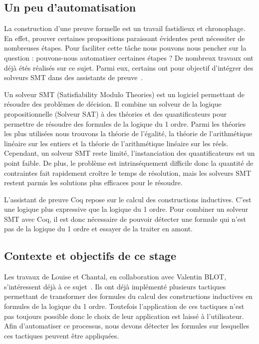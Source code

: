 \documentclass[french,titlepage]{article}
\begin{document}
\subsection{Un peu d'automatisation} \label{intro:automatisation}
La construction d'une preuve formelle est un travail fastidieux et chronophage. En effet, prouver certaines propositions paraissant évidentes peut nécessiter de nombreuses étapes. Pour faciliter cette tâche nous pouvons nous pencher sur la question : pouvons-nous automatiser certaines étapes ? De nombreux travaux ont déjà étés réalisés sur ce sujet. Parmi eux, certains ont pour objectif d'intégrer des solveurs SMT dans des assistants de preuve~\cite{DBLP:conf/cpp/ArmandFGKTW11}.

Un solveur SMT (Satisfiability Modulo Theories) est un logiciel permettant de résoudre des problèmes de décision. Il combine un solveur de la logique propositionnelle (Solveur SAT) à des théories et des quantificateurs pour permettre de résoudre des formules de la logique du 1\ier{} ordre. Parmi les théories les plus utilisées nous trouvons la théorie de l'égalité, la théorie de l'arithmétique linéaire sur les entiers et la théorie de l'arithmétique linéaire sur les réels. Cependant, un solveur SMT reste limité, l'instanciation des quantificateurs est un point faible. De plus, le problème est intrinséquement difficile donc la quantité de contraintes fait rapidement croître le temps de résolution, mais les solveurs SMT restent parmis les solutions plus efficaces pour le résoudre.

L'assistant de preuve Coq repose sur le calcul des constructions inductives. C'est une logique plus expressive que la logique du 1\ier{} ordre. Pour combiner un solveur SMT avec Coq, il est donc nécessaire de pouvoir détecter une formule qui n'est pas de la logique du 1\ier{} ordre et essayer de la traiter en amont.


\subsection{Contexte et objectifs de ce stage} \label{intro:objectifs}
Les travaux de Louise et Chantal, en collaboration avec Valentin BLOT, s'intéressent déjà à ce sujet~\cite{DBLP:journals/corr/abs-2107-02353,DBLP:conf/cpp/Blot0CPKMV23}. Ils ont déjà implémenté plusieurs tactiques permettant de transformer des formules du calcul des constructions inductives en formules de la logique du 1\ier{} ordre. Toutefois l'application de ces tactiques n'est pas toujours possible donc le choix de leur application est laissé à l'utilisateur. Afin d'automatiser ce processus, nous devons détecter les formules sur lesquelles ces tactiques peuvent être appliquées.
\end{document}
